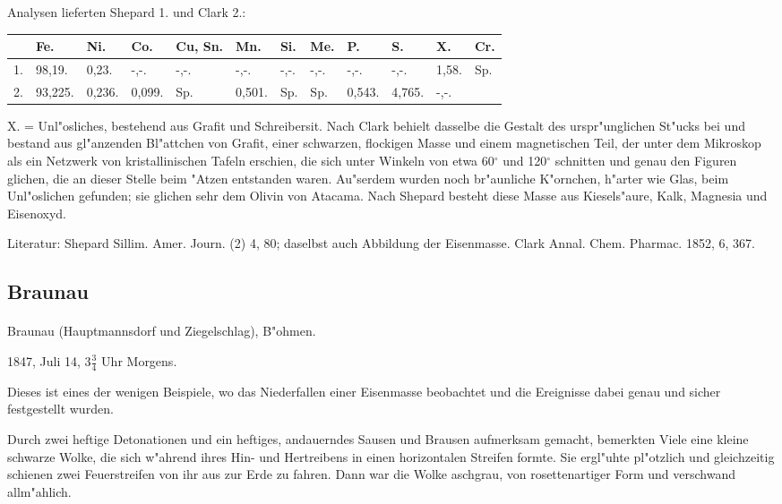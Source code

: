 \documentclass[a4paper, 11pt, oneside]{article}
\begin{document}
Analysen lieferten Shepard 1. und Clark 2.:
\begin{table}[H]
    \centering
    \begin{tabular}{l l l l l l l l l l l l}
    \hline
         & Fe. & Ni. & Co. & Cu, Sn. & Mn. & Si. & Me. & P. & S. & X. & Cr. \\ \hline
        1. & 98,19. & 0,23. & -,-. & -,-. & -,-. & -,-. & -,-. & -,-. & -,-. & 1,58. & Sp. \\
        2. & 93,225. & 0,236. & 0,099. & Sp. & 0,501. & Sp. & Sp. & 0,543. & 4,765. & -,-. &  \\
    \end{tabular}
\end{table}

X. = Unl"osliches, bestehend aus Grafit und Schreibersit. Nach Clark behielt dasselbe die Gestalt des urspr"unglichen St"ucks bei und bestand aus gl"anzenden Bl"attchen von Grafit, einer schwarzen, flockigen Masse und einem magnetischen Teil, der unter dem Mikroskop als ein Netzwerk von kristallinischen Tafeln erschien, die sich unter Winkeln von etwa 60$^\circ$ und 120$^\circ$ schnitten und genau den Figuren glichen, die an dieser Stelle beim "Atzen entstanden waren. Au"serdem wurden noch br"aunliche K"ornchen, h"arter wie Glas, beim Unl"oslichen gefunden; sie glichen sehr dem Olivin von Atacama. Nach Shepard besteht diese Masse aus Kiesels"aure, Kalk, Magnesia und Eisenoxyd.

\footnotesize
Literatur: Shepard Sillim. Amer. Journ. (2) 4, 80; daselbst auch Abbildung der Eisenmasse. Clark Annal. Chem. Pharmac. 1852, 6, 367.

\subsection{Braunau}
\normalsize
\paragraph{}
Braunau (Hauptmannsdorf und Ziegelschlag), B"ohmen.

1847, Juli 14, $3\frac{3}{4}$ Uhr Morgens.

Dieses ist eines der wenigen Beispiele, wo das Niederfallen einer Eisenmasse beobachtet und die Ereignisse dabei genau und sicher festgestellt wurden.

Durch zwei heftige Detonationen und ein heftiges, andauerndes Sausen und Brausen aufmerksam gemacht, bemerkten Viele eine kleine schwarze Wolke, die sich w"ahrend ihres Hin- und Hertreibens in einen horizontalen Streifen formte. Sie ergl"uhte pl"otzlich und gleichzeitig schienen zwei Feuerstreifen von ihr aus zur Erde zu fahren. Dann war die Wolke aschgrau, von rosettenartiger Form und verschwand allm"ahlich.
\end{document}
